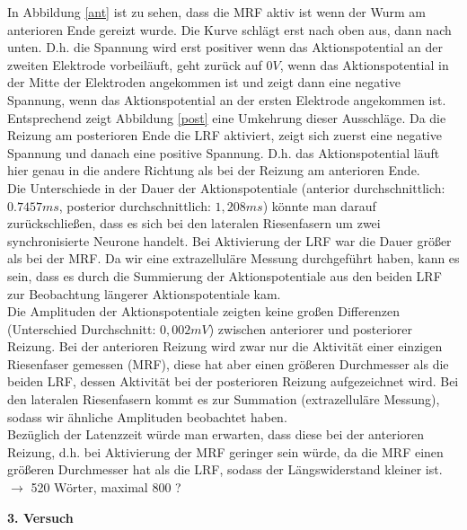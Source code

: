 \documentclass[11pt]{article}
\begin{document}
In Abbildung \ref{ant} ist zu sehen, dass die MRF aktiv ist wenn der Wurm am anterioren Ende gereizt wurde. Die Kurve schlägt erst nach oben aus, dann nach unten. D.h. die Spannung wird erst positiver wenn das Aktionspotential an der zweiten Elektrode vorbeiläuft, geht zurück auf $0V$, wenn das Aktionspotential in der Mitte der Elektroden angekommen ist und zeigt dann eine negative Spannung, wenn das Aktionspotential an der ersten Elektrode angekommen ist. \\
Entsprechend zeigt Abbildung \ref{post} eine Umkehrung dieser Ausschläge. Da die Reizung am posterioren Ende die LRF aktiviert, zeigt sich zuerst eine negative Spannung und danach eine positive Spannung. D.h. das Aktionspotential läuft hier genau in die andere Richtung als bei der Reizung am anterioren Ende. \\
Die Unterschiede in der Dauer der Aktionspotentiale (anterior durchschnittlich:$0.7457ms$, posterior durchschnittlich: $1,208ms$) könnte man darauf zurückschließen, dass es sich bei den lateralen Riesenfasern um zwei \glqq synchronisierte\grqq{} Neurone handelt. Bei Aktivierung der LRF war die Dauer größer als bei der MRF. Da wir eine extrazelluläre Messung durchgeführt haben, kann es sein, dass es durch die Summierung der Aktionspotentiale aus den beiden LRF zur Beobachtung längerer Aktionspotentiale kam. \\
Die Amplituden der Aktionspotentiale zeigten keine großen Differenzen (Unterschied Durchschnitt: $0,002mV$) zwischen anteriorer und posteriorer Reizung. Bei der anterioren Reizung wird zwar nur die Aktivität einer einzigen Riesenfaser gemessen (MRF), diese hat aber einen größeren Durchmesser als die beiden LRF, dessen Aktivität bei der posterioren Reizung aufgezeichnet wird. Bei den lateralen Riesenfasern kommt es zur Summation (extrazelluläre Messung), sodass wir ähnliche Amplituden beobachtet haben. \\
Bezüglich der Latenzzeit würde man erwarten, dass diese bei der anterioren Reizung, d.h. bei Aktivierung der MRF geringer sein würde, da die MRF einen größeren Durchmesser hat als die LRF, sodass der Längswiderstand kleiner ist. \\

$\rightarrow$ 520 Wörter, maximal 800 ? 

\textbf{3. Versuch}\\
\end{document}
